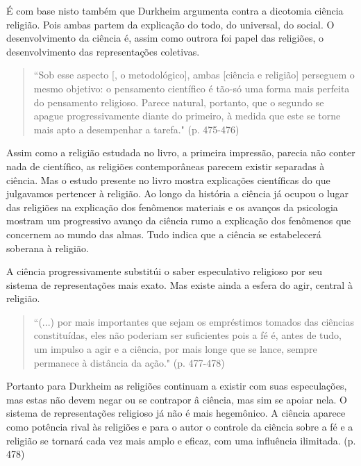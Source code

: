 \documentclass[12pt,a4paper]{article}
\begin{document}
É com base nisto também que Durkheim argumenta contra a dicotomia ciência religião. Pois ambas partem da explicação do todo, do universal, do social. O desenvolvimento da ciência é, assim como outrora foi papel das religiões, o desenvolvimento das representações coletivas.

\begin{quote}
``Sob esse aspecto [, o metodológico], ambas [ciência e religião] perseguem o mesmo objetivo: o pensamento científico é tão-só uma forma mais perfeita do pensamento religioso. Parece natural, portanto, que o segundo se apague progressivamente diante do primeiro, à medida que este se torne mais apto a desempenhar a tarefa."
(p. 475-476)
\end{quote}

Assim como a religião estudada no livro, a primeira impressão, parecia não conter nada de científico, as religiões contemporâneas parecem existir separadas à ciência. Mas o estudo presente no livro mostra explicações científicas do que julgavamos pertencer à religião. Ao longo da história a ciência já ocupou o lugar das religiões na explicação dos fenômenos materiais e os avanços da psicologia mostram um progressivo avanço da ciência rumo a explicação dos fenômenos que concernem ao mundo das almas. Tudo indica que a ciência se estabelecerá soberana à religião.

A ciência progressivamente substitúi o saber especulativo religioso por seu sistema de representações mais exato. Mas existe ainda a esfera do agir, central à religião.

\begin{quote}
``(...) por mais importantes que sejam os empréstimos tomados das ciências constituídas, eles não poderiam ser suficientes pois a fé é, antes de tudo, um impulso a agir e a ciência, por mais longe que se lance, sempre permanece à distância da ação."
 (p. 477-478)
\end{quote}

Portanto para Durkheim as religiões continuam a existir com suas especulações, mas estas não devem negar ou se contrapor â ciência, mas sim se apoiar nela. O sistema de representações religioso já não é mais hegemônico. A ciência aparece como potência rival às religiões e para o autor o controle da ciência sobre a fé e a religião se tornará cada vez mais amplo e eficaz, com uma influência ilimitada. (p. 478)
\end{document}
